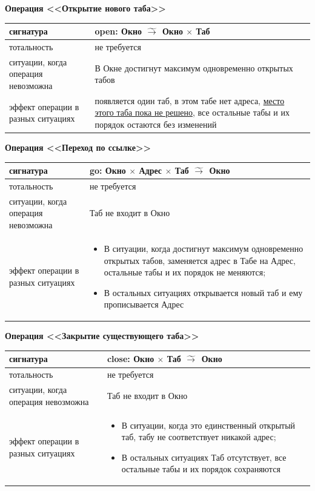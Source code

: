 \documentclass[14pt, twoside]{extreport}
\begin{document}
{\sf
\textbf{Операция <<Открытие нового таба>>}

\begin{tabular}{|p{}|p{}|}
  \hline
  сигнатура & open: Окно $\;\widetilde{\rightarrow}\;$ Окно $\times$ Таб \\ \hline
  тотальность & не требуется \\ \hline
  ситуации, когда операция невозможна & В Окне достигнут максимум одновременно открытых табов \\ \hline
  эффект операции в разных ситуациях & появляется один таб, в этом табе нет адреса, \underline{место этого таба пока не решено}, все остальные табы и их порядок остаются без изменений \\ \hline
\end{tabular}

\textbf{Операция <<Переход по ссылке>>}

\begin{tabular}{|p{}|p{}|}
  \hline
  сигнатура & go: Окно $\times$ Адрес $\times$ Таб $\;\widetilde{\rightarrow}\;$ Окно \\ \hline
  тотальность & не требуется \\ \hline
  ситуации, когда операция невозможна & Таб не входит в Окно \\ \hline
  эффект операции в разных ситуациях & \begin{itemize}\item В ситуации, когда достигнут максимум одновременно открытых табов, заменяется адрес в Табе на Адрес, остальные табы и их порядок не меняются; \item В остальных ситуациях открывается новый таб и ему прописывается Адрес\end{itemize} \\ \hline
\end{tabular}

\textbf{Операция <<Закрытие существующего таба>>}

\begin{tabular}{|p{}|p{}|}
  \hline
  сигнатура & close: Окно $\times$ Таб $\;\widetilde{\rightarrow}\;$ Окно \\ \hline
  тотальность & не требуется \\ \hline
  ситуации, когда операция невозможна & Таб не входит в Окно \\ \hline
  эффект операции в разных ситуациях & \begin{itemize}\item В ситуации, когда это единственный открытый таб, табу не соответствует никакой адрес;\item В остальных ситуациях Таб отсутствует, все остальные табы и их порядок сохраняются \end{itemize} \\ \hline
\end{tabular}
}
\end{document}
